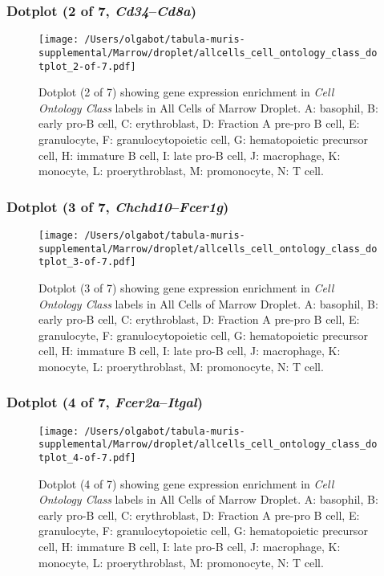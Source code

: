 \clearpage

\subsubsection{Dotplot (2 of 7, \emph{Cd34}--\emph{Cd8a})}
\begin{figure}[h]
\centering
\texttt{[image: /Users/olgabot/tabula-muris-supplemental/Marrow/droplet/allcells\_cell\_ontology\_class\_dotplot\_2-of-7.pdf]}

\caption{ Dotplot (2 of 7)  showing gene expression enrichment in \emph{Cell Ontology Class} labels in All Cells of Marrow Droplet. A: basophil, B: early pro-B cell, C: erythroblast, D: Fraction A pre-pro B cell, E: granulocyte, F: granulocytopoietic cell, G: hematopoietic precursor cell, H: immature B cell, I: late pro-B cell, J: macrophage, K: monocyte, L: proerythroblast, M: promonocyte, N: T cell.}
\end{figure}


\clearpage

\subsubsection{Dotplot (3 of 7, \emph{Chchd10}--\emph{Fcer1g})}
\begin{figure}[h]
\centering
\texttt{[image: /Users/olgabot/tabula-muris-supplemental/Marrow/droplet/allcells\_cell\_ontology\_class\_dotplot\_3-of-7.pdf]}

\caption{ Dotplot (3 of 7)  showing gene expression enrichment in \emph{Cell Ontology Class} labels in All Cells of Marrow Droplet. A: basophil, B: early pro-B cell, C: erythroblast, D: Fraction A pre-pro B cell, E: granulocyte, F: granulocytopoietic cell, G: hematopoietic precursor cell, H: immature B cell, I: late pro-B cell, J: macrophage, K: monocyte, L: proerythroblast, M: promonocyte, N: T cell.}
\end{figure}


\clearpage

\subsubsection{Dotplot (4 of 7, \emph{Fcer2a}--\emph{Itgal})}
\begin{figure}[h]
\centering
\texttt{[image: /Users/olgabot/tabula-muris-supplemental/Marrow/droplet/allcells\_cell\_ontology\_class\_dotplot\_4-of-7.pdf]}

\caption{ Dotplot (4 of 7)  showing gene expression enrichment in \emph{Cell Ontology Class} labels in All Cells of Marrow Droplet. A: basophil, B: early pro-B cell, C: erythroblast, D: Fraction A pre-pro B cell, E: granulocyte, F: granulocytopoietic cell, G: hematopoietic precursor cell, H: immature B cell, I: late pro-B cell, J: macrophage, K: monocyte, L: proerythroblast, M: promonocyte, N: T cell.}
\end{figure}


